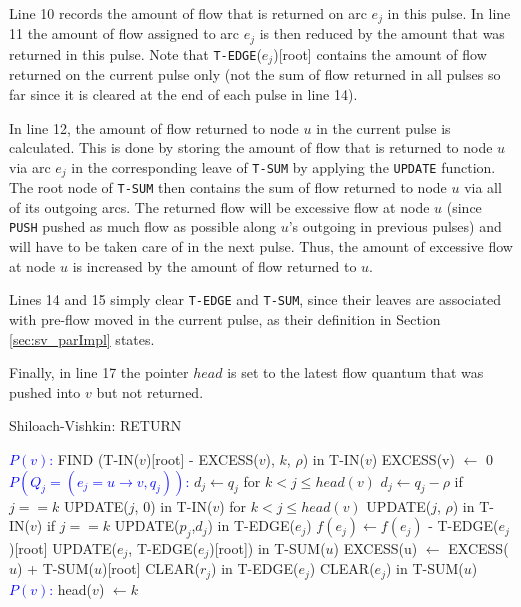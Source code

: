 \documentclass[a4paper,10pt, twocolumn]{article}
\begin{document}
Line 10 records the amount of flow that is returned on arc $e_j$ in this pulse. In line 11 the amount of flow assigned to arc $e_j$ is then reduced by the amount that was returned in this pulse. Note that \lstinline|T-EDGE|($e_j$)[root] contains the amount of flow returned on the current pulse only (not the sum of flow returned in all pulses so far since it is cleared at the end of each pulse in line 14).

In line 12, the amount of flow returned to node $u$ in the current pulse is calculated. This is done by storing the amount of flow that is returned to node $u$ via arc $e_j$ in the corresponding leave of \lstinline|T-SUM| by applying the \lstinline|UPDATE| function. The root node of \lstinline|T-SUM| then contains the sum of flow returned to node $u$ via all of its outgoing arcs. The returned flow will be excessive flow at node $u$ (since \lstinline|PUSH| pushed as much flow as possible along $u$'s outgoing in previous pulses) and will have to be taken care of in the next pulse. Thus, the amount of excessive flow at node $u$ is increased by the amount of flow returned to $u$.

Lines 14 and 15 simply clear \lstinline|T-EDGE| and \lstinline|T-SUM|, since their leaves are associated with pre-flow moved in the current pulse, as their definition in Section \ref{sec:sv_parImpl} states.

Finally, in line 17 the pointer $head$ is set to the latest flow quantum that was pushed into $v$ but not returned.

\begin{algorithm}
\caption{Shiloach-Vishkin: RETURN}
\label{algo:sv_return}
\begin{algorithmic}[1]
		\State \textcolor{blue}{$P(v)$:}
		\State FIND (T-IN($v$)[root] - EXCESS($v$), $k$, $\rho$) in T-IN($v$)
		\State EXCESS(v) $\gets$ 0
		\State \textcolor{blue}{$P(Q_j = (e_j = u \rightarrow v, q_j))$:}
		\State $d_j \gets q_j$ for $k < j \leq head(v)$
		\State $d_j \gets q_j - \rho$ if $j == k$
		\State UPDATE($j$, 0) in T-IN($v$) for $k < j \leq head(v)$
		\State UPDATE($j$, $\rho$) in T-IN($v$) if $j == k$
		\State UPDATE($p_j$,$d_j$) in T-EDGE($e_j$)
		\State $f(e_j) \gets f(e_j)$ - T-EDGE($e_j$)[root]
		\State UPDATE($e_j$, T-EDGE($e_j$)[root]) in T-SUM($u$)
		\State EXCESS(u) $\gets$ EXCESS($u$) + T-SUM($u$)[root]
		\State CLEAR($r_j$) in T-EDGE($e_j$)
		\State CLEAR($e_j$) in T-SUM($u$)
		\State \textcolor{blue}{$P(v)$:}
		\State head($v$) $\gets k$
	\EndFunction
\end{algorithmic}
\end{algorithm}
\end{document}
